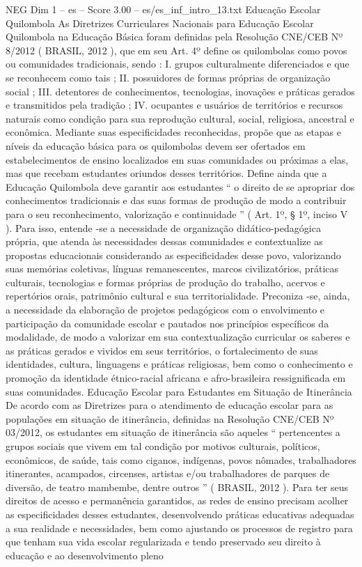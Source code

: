 \begin{textsample}{NEG Dim 1 – es – Score 3.00 – es/es\_inf\_intro\_13.txt}  \label{ex:f1_neg_098}
Educação Escolar Quilombola As Diretrizes Curriculares Nacionais para Educação Escolar Quilombola na Educação Básica foram definidas pela Resolução CNE/CEB Nº 8/2012 ( BRASIL, 2012 ), que em seu Art. 4º define os quilombolas como povos ou comunidades tradicionais, sendo : I. grupos culturalmente diferenciados e que se reconhecem como tais ; II. possuidores de formas próprias de organização social ; III. detentores de conhecimentos, tecnologias, inovações e práticas gerados e transmitidos pela tradição ; IV. ocupantes e usuários de territórios e recursos naturais como condição para sua reprodução cultural, social, religiosa, ancestral e econômica.
Mediante suas especificidades reconhecidas, propõe que as etapas e níveis da educação básica para os quilombolas devem ser ofertados em estabelecimentos de ensino localizados em suas comunidades ou próximas a elas, mas que recebam estudantes oriundos desses territórios.
Define ainda que a Educação Quilombola deve garantir aos estudantes “ o direito de se apropriar dos conhecimentos tradicionais e das suas formas de produção de modo a contribuir para o seu reconhecimento, valorização e continuidade ” ( Art. 1º, § 1º, inciso V ).
Para isso, entende -se a necessidade de organização didático-pedagógica própria, que atenda às necessidades dessas comunidades e contextualize as propostas educacionais considerando as especificidades desse povo, valorizando suas memórias coletivas, línguas remanescentes, marcos civilizatórios, práticas culturais, tecnologias e formas próprias de produção do trabalho, acervos e repertórios orais, patrimônio cultural e sua territorialidade.
Preconiza -se, ainda, a necessidade da elaboração de projetos pedagógicos com o envolvimento e participação da comunidade escolar e pautados nos princípios específicos da modalidade, de modo a valorizar em sua contextualização curricular os saberes e as práticas gerados e vividos em seus territórios, o fortalecimento de suas identidades, cultura, linguagens e práticas religiosas, bem como o conhecimento e promoção da identidade étnico-racial africana e afro-brasileira ressignificada em suas comunidades.
Educação Escolar para Estudantes em Situação de Itinerância De acordo com as Diretrizes para o atendimento de educação escolar para as populações em situação de itinerância, definidas na Resolução CNE/CEB Nº 03/2012, os estudantes em situação de itinerância são aqueles “ pertencentes a grupos sociais que vivem em tal condição por motivos culturais, políticos, econômicos, de saúde, tais como ciganos, indígenas, povos nômades, trabalhadores itinerantes, acampados, circenses, artistas e/ou trabalhadores de parques de diversão, de teatro mambembe, dentre outros ” ( BRASIL, 2012 ).
Para ter seus direitos de acesso e permanência garantidos, as redes de ensino precisam acolher as especificidades desses estudantes, desenvolvendo práticas educativas adequadas a sua realidade e necessidades, bem como ajustando os processos de registro para que tenham sua vida escolar regularizada e tendo preservado seu direito à educação e ao desenvolvimento pleno

\end{textsample}
